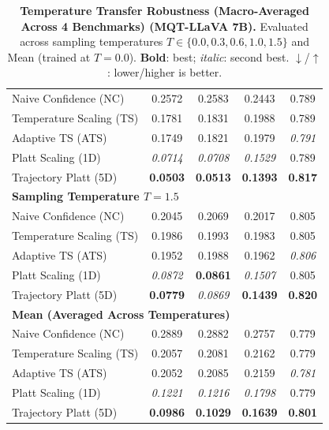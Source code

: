 \begin{table}[t]
{\begin{tabular}{lcccc}
\midrule
Naive Confidence (NC) & 0.2572 & 0.2583 & 0.2443 & 0.789 \\
Temperature Scaling (TS) & 0.1781 & 0.1831 & 0.1988 & 0.789 \\
Adaptive TS (ATS) & 0.1749 & 0.1821 & 0.1979 & \textit{0.791} \\
Platt Scaling (1D) & \textit{0.0714} & \textit{0.0708} & \textit{0.1529} & 0.789 \\
Trajectory Platt (5D) & \textbf{0.0503} & \textbf{0.0513} & \textbf{0.1393} & \textbf{0.817} \\
\midrule
\multicolumn{5}{l}{\textbf{Sampling Temperature $T = 1.5$}} \\
\midrule
Naive Confidence (NC) & 0.2045 & 0.2069 & 0.2017 & 0.805 \\
Temperature Scaling (TS) & 0.1986 & 0.1993 & 0.1983 & 0.805 \\
Adaptive TS (ATS) & 0.1952 & 0.1988 & 0.1962 & \textit{0.806} \\
Platt Scaling (1D) & \textit{0.0872} & \textbf{0.0861} & \textit{0.1507} & 0.805 \\
Trajectory Platt (5D) & \textbf{0.0779} & \textit{0.0869} & \textbf{0.1439} & \textbf{0.820} \\
\midrule
\multicolumn{5}{l}{\textbf{Mean (Averaged Across Temperatures)}} \\
\midrule
Naive Confidence (NC) & 0.2889 & 0.2882 & 0.2757 & 0.779 \\
Temperature Scaling (TS) & 0.2057 & 0.2081 & 0.2162 & 0.779 \\
Adaptive TS (ATS) & 0.2052 & 0.2085 & 0.2159 & \textit{0.781} \\
Platt Scaling (1D) & \textit{0.1221} & \textit{0.1216} & \textit{0.1798} & 0.779 \\
Trajectory Platt (5D) & \textbf{0.0986} & \textbf{0.1029} & \textbf{0.1639} & \textbf{0.801} \\
\bottomrule
\end{tabular}%
}
\caption{\textbf{Temperature Transfer Robustness (Macro-Averaged Across 4 Benchmarks) (MQT-LLaVA 7B).} Evaluated across sampling temperatures $T \in \{0.0, 0.3, 0.6, 1.0, 1.5\}$ and Mean (trained at $T=0.0$). \textbf{Bold}: best; \textit{italic}: second best. $\downarrow$/$\uparrow$: lower/higher is better.}
\label{tab:temp_transfer_mqt_macro}
\end{table}
